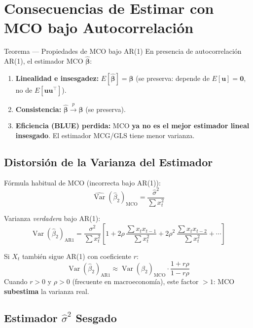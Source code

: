 \documentclass[11pt, letterpaper]{article}
\begin{document}
\section{Consecuencias de Estimar con MCO bajo Autocorrelaci\'on}

\begin{teorema}{Teorema --- Propiedades de MCO bajo AR(1)}
En presencia de autocorrelaci\'on AR(1), el estimador MCO $\hat{\bm\beta}$:
\begin{enumerate}
  \item \textbf{Linealidad e insesgadez:}
    $E[\hat{\bm\beta}] = \bm\beta$ \quad (se preserva: depende de
    $E[\mathbf{u}]=\mathbf{0}$, no de $E[\mathbf{u}\mathbf{u}^\top]$).
  \item \textbf{Consistencia:}
    $\hat{\bm\beta} \xrightarrow{p} \bm\beta$ \quad (se preserva).
  \item \textbf{Eficiencia (BLUE) perdida:}
    MCO \textbf{ya no es el mejor estimador lineal insesgado}.
    El estimador MCG/GLS tiene menor varianza.
\end{enumerate}
\end{teorema}

\subsection{Distorsi\'on de la Varianza del Estimador}

F\'ormula habitual de MCO (incorrecta bajo AR(1)):
\[
  \widehat{\operatorname{Var}}(\hat\beta_2)_{\text{MCO}} = \frac{\hat\sigma^2}{\sum x_t^2}
\]

Varianza \emph{verdadera} bajo AR(1):
\[
  \operatorname{Var}(\hat\beta_2)_{\text{AR1}}
  = \frac{\sigma^2}{\sum x_t^2}
    \left[
      1 + 2\rho\,\frac{\sum x_t x_{t-1}}{\sum x_t^2}
        + 2\rho^2\,\frac{\sum x_t x_{t-2}}{\sum x_t^2} + \cdots
    \right]
\]

Si $X_t$ tambi\'en sigue AR(1) con coeficiente $r$:
\[
  \boxed{
    \operatorname{Var}(\hat\beta_2)_{\text{AR1}}
    \approx
    \operatorname{Var}(\hat\beta_2)_{\text{MCO}}
    \cdot \frac{1 + r\rho}{1 - r\rho}
  }
\]
Cuando $r > 0$ y $\rho > 0$ (frecuente en macroeconom\'ia), este factor
$>1$: MCO \textbf{subestima} la varianza real.

\subsection{Estimador $\hat\sigma^2$ Sesgado}
\end{document}
